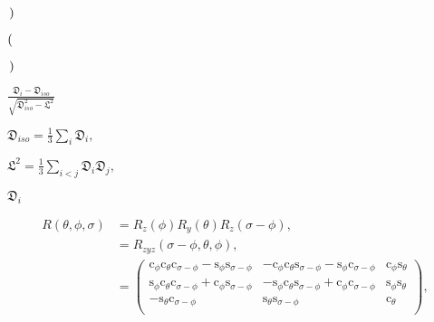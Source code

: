 \documentclass[a4paper,11pt,twoside,openright]{book}
\def\lthtmlcheckvsize{\ifdim\ht\sizebox<\vsize 
  \ifdim\wd\sizebox<\hsize\expandafter\hfill\fi \expandafter\vfill
  \else\expandafter\vss\fi}%
\begin{document}
{\newpage\clearpage
{}%
$\displaystyle \left.\vphantom{1 - \mu_i }\right)$%
\lthtmlindisplaymathZ
\lthtmlcheckvsize\clearpage}

{\newpage\clearpage
{}%
$\displaystyle \left(\vphantom{1 + \mu_i }\right.$%
\lthtmlindisplaymathZ
\lthtmlcheckvsize\clearpage}

{\newpage\clearpage
{}%
$\displaystyle \left.\vphantom{1 + \mu_i }\right)$%
\lthtmlindisplaymathZ
\lthtmlcheckvsize\clearpage}

{\newpage\clearpage
{}%
$\displaystyle {\frac{{\mathfrak{D}_i - \mathfrak{D}_{iso}}}{{\sqrt{\mathfrak{D}_{iso}^2 - \mathfrak{L}^2}}}}$%
\lthtmlindisplaymathZ
\lthtmlcheckvsize\clearpage}

{\newpage\clearpage
{}%
$\displaystyle \mathfrak{D}_{iso} = \tfrac{1}{3} \sum_i \mathfrak{D}_i ,$%
\lthtmlindisplaymathZ
\lthtmlcheckvsize\clearpage}

{\newpage\clearpage
{}%
$\displaystyle \mathfrak{L}^2 = \tfrac{1}{3} \sum_{i<j} \mathfrak{D}_i \mathfrak{D}_j ,$%
\lthtmlindisplaymathZ
\lthtmlcheckvsize\clearpage}

{\newpage\clearpage
{}%
$ \mathfrak{D}_i$%
\lthtmlindisplaymathZ
\lthtmlcheckvsize\clearpage}

{\newpage\clearpage
\setcounter{equation}{73}
%
\begin{subequations}\begin{align}
R(\theta, \phi, \sigma)
&= R_z(\phi)R_y(\theta)R_z(\sigma-\phi) , \\
&= R_{zyz}(\sigma-\phi, \theta, \phi) , \\
&= \begin{pmatrix}
\mathrm{c}_\phi \mathrm{c}_\theta \mathrm{c}_{\sigma-\phi} - \mathrm{s}_\phi \mathrm{s}_{\sigma-\phi} & -\mathrm{c}_\phi \mathrm{c}_\theta \mathrm{s}_{\sigma-\phi} - \mathrm{s}_\phi \mathrm{c}_{\sigma-\phi} & \mathrm{c}_\phi \mathrm{s}_\theta \\
\mathrm{s}_\phi \mathrm{c}_\theta \mathrm{c}_{\sigma-\phi} + \mathrm{c}_\phi \mathrm{s}_{\sigma-\phi} & -\mathrm{s}_\phi \mathrm{c}_\theta \mathrm{s}_{\sigma-\phi} + \mathrm{c}_\phi \mathrm{c}_{\sigma-\phi} & \mathrm{s}_\phi \mathrm{s}_\theta \\
-\mathrm{s}_\theta \mathrm{c}_{\sigma-\phi}                                                           &  \mathrm{s}_\theta \mathrm{s}_{\sigma-\phi}                                                            & \mathrm{c}_\theta \\
\end{pmatrix} ,\end{align}\end{subequations}%
\lthtmldisplayZ
\lthtmlcheckvsize\clearpage}
\end{document}
